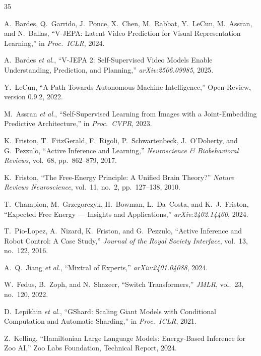 \documentclass[11pt,letterpaper]{article}
\begin{document}

\begin{thebibliography}{35}

A.~Bardes, Q.~Garrido, J.~Ponce, X.~Chen, M.~Rabbat, Y.~LeCun, M.~Assran, and N.~Ballas, ``V-JEPA: Latent Video Prediction for Visual Representation Learning,'' in \emph{Proc.\ ICLR}, 2024.

A.~Bardes \emph{et al.}, ``V-JEPA 2: Self-Supervised Video Models Enable Understanding, Prediction, and Planning,'' \emph{arXiv:2506.09985}, 2025.

Y.~LeCun, ``A Path Towards Autonomous Machine Intelligence,'' Open Review, version 0.9.2, 2022.

M.~Assran \emph{et al.}, ``Self-Supervised Learning from Images with a Joint-Embedding Predictive Architecture,'' in \emph{Proc.\ CVPR}, 2023.

K.~Friston, T.~FitzGerald, F.~Rigoli, P.~Schwartenbeck, J.~O'Doherty, and G.~Pezzulo, ``Active Inference and Learning,'' \emph{Neuroscience \& Biobehavioral Reviews}, vol.~68, pp.~862--879, 2017.

K.~Friston, ``The Free-Energy Principle: A Unified Brain Theory?'' \emph{Nature Reviews Neuroscience}, vol.~11, no.~2, pp.~127--138, 2010.

T.~Champion, M.~Grzegorczyk, H.~Bowman, L.~Da~Costa, and K.~J.~Friston, ``Expected Free Energy --- Insights and Applications,'' \emph{arXiv:2402.14460}, 2024.

T.~Pio-Lopez, A.~Nizard, K.~Friston, and G.~Pezzulo, ``Active Inference and Robot Control: A Case Study,'' \emph{Journal of the Royal Society Interface}, vol.~13, no.~122, 2016.

A.~Q.~Jiang \emph{et al.}, ``Mixtral of Experts,'' \emph{arXiv:2401.04088}, 2024.

W.~Fedus, B.~Zoph, and N.~Shazeer, ``Switch Transformers,'' \emph{JMLR}, vol.~23, no.~120, 2022.

D.~Lepikhin \emph{et al.}, ``GShard: Scaling Giant Models with Conditional Computation and Automatic Sharding,'' in \emph{Proc.\ ICLR}, 2021.

Z.~Kelling, ``Hamiltonian Large Language Models: Energy-Based Inference for Zoo AI,'' Zoo Labs Foundation, Technical Report, 2024.


\end{thebibliography}
\end{document}

